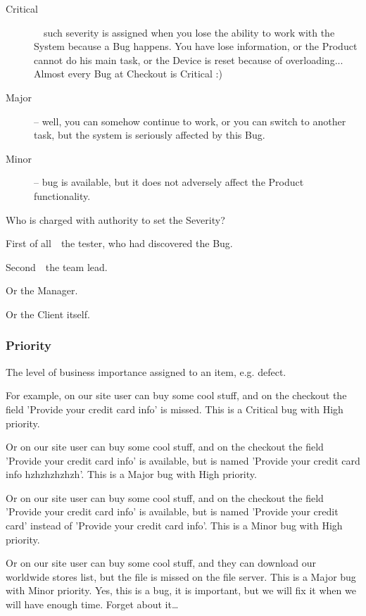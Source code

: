 \begin{description}
\item[Critical]~\textemdash~such severity is assigned when you lose the ability to work with the System because a Bug happens. You have lose information, or the Product cannot do his main task, or the Device is reset because of overloading... Almost every Bug at Checkout is Critical :)

\item[Major] – well, you can somehow continue to work, or you can switch to another task, but the system is seriously affected by this Bug.

\item[Minor] – bug is available, but it does not adversely affect the Product functionality.                                                                                     \end{description}

Who is charged with authority to set the Severity? 

First of all~\textemdash~the tester, who had discovered the Bug. 

Second~\textemdash~the team lead. 

Or the Manager. 

Or the Client itself.

\subsubsection{Priority}
\label{sec:Priority}

The level of business importance assigned to an item, e.g. defect.

For example, on our site user can buy some cool stuff, and on the checkout the field 'Provide your credit card info' is missed. This is a Critical bug with High priority.

Or on our site user can buy some cool stuff, and on the checkout the field 'Provide your credit card info' is available, but is named 'Provide your credit card info hzhzhzhzhzh'. This is a Major bug with High priority.

Or on our site user can buy some cool stuff, and on the checkout the field 'Provide your credit card info' is available, but is named 'Provide your credit card' instead of 'Provide your credit card info'. This is a Minor bug with High priority.

Or on our site user can buy some cool stuff, and they can download our worldwide stores list, but the file is missed on the file server. This is a Major bug with Minor priority. Yes, this is a bug, it is important, but we will fix it when we will have enough time. Forget about it\ldots
